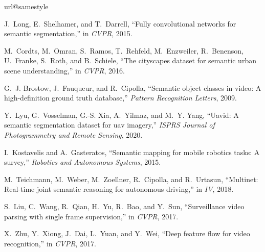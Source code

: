 \documentclass[journal]{IEEEtran}
\begin{document}
\begin{thebibliography}{10}
	\providecommand{\url}[1]{#1}
	\csname url@samestyle\endcsname
	\providecommand{\newblock}{\relax}
	\providecommand{\bibinfo}[2]{#2}
	\providecommand{\BIBentrySTDinterwordspacing}{\spaceskip=0pt\relax}
	\providecommand{\BIBentryALTinterwordstretchfactor}{4}
	\providecommand{\BIBentryALTinterwordspacing}{\spaceskip=\fontdimen2\font plus
		\BIBentryALTinterwordstretchfactor\fontdimen3\font minus
		\fontdimen4\font\relax}
	\providecommand{\BIBforeignlanguage}[2]{{\expandafter\ifx\csname l@#1\endcsname\relax
			\typeout{** WARNING: IEEEtran.bst: No hyphenation pattern has been}\typeout{** loaded for the language `#1'. Using the pattern for}\typeout{** the default language instead.}\else
			\language=\csname l@#1\endcsname
			\fi
			#2}}
	\providecommand{\BIBdecl}{\relax}
	\BIBdecl
	
	J.~Long, E.~Shelhamer, and T.~Darrell, ``Fully convolutional networks for
	semantic segmentation,'' in \emph{CVPR}, 2015.
	
	M.~Cordts, M.~Omran, S.~Ramos, T.~Rehfeld, M.~Enzweiler, R.~Benenson,
	U.~Franke, S.~Roth, and B.~Schiele, ``The cityscapes dataset for semantic
	urban scene understanding,'' in \emph{CVPR}, 2016.
	
	G.~J. Brostow, J.~Fauqueur, and R.~Cipolla, ``Semantic object classes in video:
	A high-definition ground truth database,'' \emph{Pattern Recognition
		Letters}, 2009.
	
	Y.~Lyu, G.~Vosselman, G.-S. Xia, A.~Yilmaz, and M.~Y. Yang, ``Uavid: A semantic
	segmentation dataset for uav imagery,'' \emph{ISPRS Journal of Photogrammetry
		and Remote Sensing}, 2020.
	
	I.~Kostavelis and A.~Gasteratos, ``Semantic mapping for mobile robotics tasks:
	A survey,'' \emph{Robotics and Autonomous Systems}, 2015.
	
	M.~Teichmann, M.~Weber, M.~Zoellner, R.~Cipolla, and R.~Urtasun, ``Multinet:
	Real-time joint semantic reasoning for autonomous driving,'' in \emph{IV},
	2018.
	
	S.~Liu, C.~Wang, R.~Qian, H.~Yu, R.~Bao, and Y.~Sun, ``Surveillance video
	parsing with single frame supervision,'' in \emph{CVPR}, 2017.
	
	X.~Zhu, Y.~Xiong, J.~Dai, L.~Yuan, and Y.~Wei, ``Deep feature flow for video
	recognition,'' in \emph{CVPR}, 2017.
	

\end{thebibliography}
\end{document}
